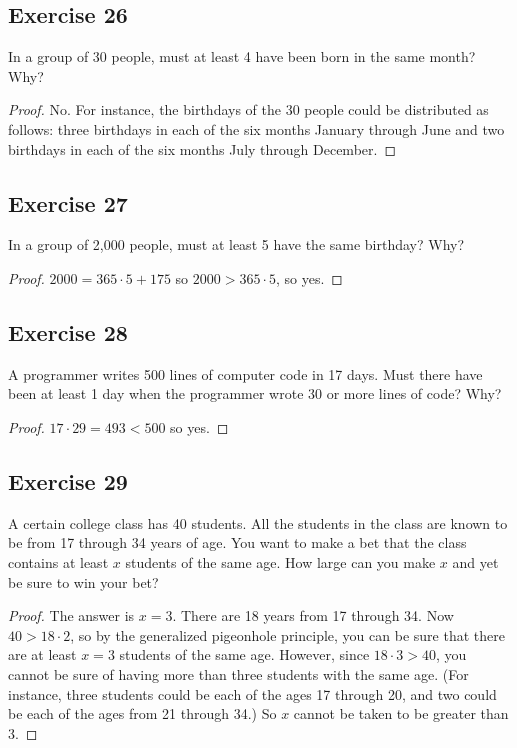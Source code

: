 \documentclass[14pt]{extarticle}
\begin{document}
\subsection{Exercise 26}
In a group of 30 people, must at least 4 have been born in the same month? Why?

\begin{proof}
     No. For instance, the birthdays of the 30 people could be distributed as follows: three birthdays in each of the six
     months January through June and two birthdays in each of the six months July through December.
\end{proof}

\subsection{Exercise 27}
In a group of 2,000 people, must at least 5 have the same birthday? Why?

\begin{proof}
     \(2000 = 365 \cdot 5 + 175\) so \(2000 > 365 \cdot 5\), so yes.
\end{proof}

\subsection{Exercise 28}
A programmer writes 500 lines of computer code in 17 days. Must there have been at least 1 day when the programmer
wrote 30 or more lines of code? Why?

\begin{proof}
     \(17 \cdot 29 = 493 < 500\) so yes.
\end{proof}

\subsection{Exercise 29}
A certain college class has 40 students. All the students in the class are known to be from 17 through 34 years of
age. You want to make a bet that the class contains at least \(x\) students of the same age. How large can you
make \(x\) and yet be sure to win your bet?

\begin{proof}
     The answer is \(x = 3\). There are 18 years from 17 through 34. Now \(40 > 18 \cdot 2\), so by the generalized
     pigeonhole principle, you can be sure that there are at least \(x = 3\) students of the same age. However, since
     \(18 \cdot 3 > 40\), you cannot be sure of having more than three students with the same age. (For instance, three
     students could be each of the ages 17 through 20, and two could be each of the ages from 21 through 34.) So \(x\)
     cannot be taken to be greater than 3.
\end{proof}
\end{document}

